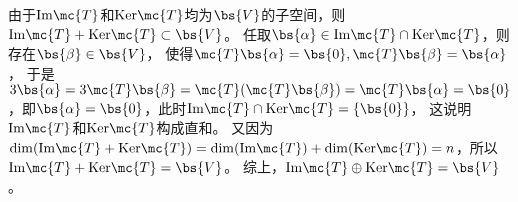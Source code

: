 \documentclass[12pt, a4paper, oneside, UTF8]{ctexbook}
\begin{document}
\begin{solution}
    由于$\mathrm{Im}\mc{T}$和$\mathrm{Ker}\mc{T}$均为$\bs{V}$的子空间，则
    $\mathrm{Im}\mc{T}+ \mathrm{Ker}\mc{T} \subset \bs{V}$。
    任取$\bs{\alpha}\in \mathrm{Im}\mc{T}\cap \mathrm{Ker}\mc{T}$，则存在$\bs{\beta}\in \bs{V}$，
    使得$\mc{T}\bs{\alpha}=\bs{0},\mc{T} \bs{\beta}=\bs{\alpha} $，
    于是$3\bs{\alpha}=3\mc{T}\bs{\beta}=\mc{T}(\mc{T} \bs{\beta})=
    \mc{T}\bs{\alpha}=\bs{0}$，即$\bs{\alpha}=\bs{0}$，此时$\mathrm{Im}\mc{T}\cap \mathrm{Ker}\mc{T}=\{\bs{0}\}$，
    这说明$\mathrm{Im}\mc{T}$和$\mathrm{Ker}\mc{T}$构成直和。
    又因为$\mathrm{dim}(\mathrm{Im}\mc{T}+\mathrm{Ker}\mc{T})=\mathrm{dim}(\mathrm{Im}\mc{T})
    +\mathrm{dim}(\mathrm{Ker}\mc{T})=n$，所以$\mathrm{Im}\mc{T}+ \mathrm{Ker}\mc{T} = \bs{V}$。
    综上，$\mathrm{Im}\mc{T}\oplus \mathrm{Ker}\mc{T} = \bs{V}$。
    
\end{solution}


\ifx\allfiles\undefined
\end{document}
